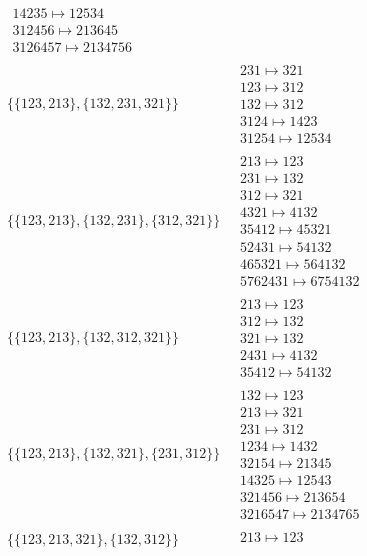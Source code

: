 \begin{scriptsize}
\begin{align}
\begin{matrix}
14235 \mapsto 12534
\\
312456 \mapsto 213645
\\
3126457 \mapsto 2134756
\end{matrix}
\\
\{\{123, 213\}, \{132, 231, 321\}\}
\ 
&
\begin{matrix}
231 \mapsto 321
\\
123 \mapsto 312
\\
132 \mapsto 312
\\
3124 \mapsto 1423
\\
31254 \mapsto 12534
\end{matrix}
\\
\{\{123, 213\}, \{132, 231\}, \{312, 321\}\}
\ 
&
\begin{matrix}
213 \mapsto 123
\\
231 \mapsto 132
\\
312 \mapsto 321
\\
4321 \mapsto 4132
\\
35412 \mapsto 45321
\\
52431 \mapsto 54132
\\
465321 \mapsto 564132
\\
5762431 \mapsto 6754132
\end{matrix}
\\
\{\{123, 213\}, \{132, 312, 321\}\}
\ 
&
\begin{matrix}
213 \mapsto 123
\\
312 \mapsto 132
\\
321 \mapsto 132
\\
2431 \mapsto 4132
\\
35412 \mapsto 54132
\end{matrix}
\\
\{\{123, 213\}, \{132, 321\}, \{231, 312\}\}
\ 
&
\begin{matrix}
132 \mapsto 123
\\
213 \mapsto 321
\\
231 \mapsto 312
\\
1234 \mapsto 1432
\\
32154 \mapsto 21345
\\
14325 \mapsto 12543
\\
321456 \mapsto 213654
\\
3216547 \mapsto 2134765
\end{matrix}
\\
\{\{123, 213, 321\}, \{132, 312\}\}
\ 
&
\begin{matrix}
213 \mapsto 123
\\

\end{matrix}
\end{align}
\end{scriptsize}
